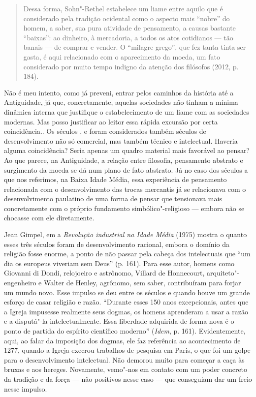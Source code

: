 \begin{quote}
Dessa forma, Sohn"-Rethel estabelece um liame entre aquilo que é
considerado pela tradição ocidental como o aspecto mais ``nobre'' do
homem, a saber, sua pura atividade de pensamento, a causas bastante
``baixas'': ao dinheiro, à mercadoria, a todos os atos cotidianos ---
tão banais --- de comprar e vender. O ``milagre grego'', que fez tanta
tinta ser gasta, é aqui relacionado com o aparecimento da moeda, um fato
considerado por muito tempo indigno da atenção dos filósofos (2012, p. 184).
\end{quote}

Não é meu intento, como já preveni, entrar pelos caminhos da história
até a Antiguidade, já que, concretamente, aquelas sociedades não tinham
a mínima dinâmica interna que justifique o estabelecimento de um liame
com as sociedades modernas. Mas posso justificar ao leitor essa rápida
excursão por certa coincidência.. Os séculos ,
 e  foram considerados também
séculos de desenvolvimento não só comercial, mas também técnico e
intelectual. Haveria alguma coincidência? Seria apenas um quadro
material mais favorável ao pensar? Ao que parece, na Antiguidade, a
relação entre filosofia, pensamento abstrato e surgimento da moeda se dá
num plano de fato abstrato. Já no caso dos séculos a que nos referimos,
na Baixa Idade Média, essa experiência de pensamento relacionada com o
desenvolvimento das trocas mercantis já se relacionava com o
desenvolvimento paulatino de uma forma de pensar que tensionava mais
concretamente com o próprio fundamento simbólico"-religioso --- embora não
se chocasse com ele diretamente.

Jean Gimpel, em a \emph{Revolução industrial na Idade Média} (1975)
mostra o quanto esses três séculos foram de desenvolvimento racional,
embora o domínio da religião fosse enorme, a ponto de não passar pela
cabeça dos intelectuais que ``um dia os europeus viveriam sem Deus'' (p.
161). Para esse autor, homens como Giovanni di Dondi, relojoeiro e
astrônomo, Villard de Honnecourt, arquiteto"-engenheiro e Walter de
Henley, agrônomo, sem saber, contribuíram para forjar um mundo novo.
Esse impulso se deu entre os séculos  e  quando houve um grande
esforço de casar religião e razão. ``Durante esses 150 anos
excepcionais, antes que a Igreja impusesse realmente seus dogmas, os
homens aprenderam a usar a razão e a disputá"-la intelectualmente. Essa
liberdade adquirida de forma nova é o ponto de partida do espírito
científico moderno'' (\emph{Idem}, p. 161). Evidentemente, aqui, ao
falar da imposição dos dogmas, ele faz referência ao acontecimento de
1277, quando a Igreja execrou trabalhos de pesquisa em Paris, o que foi
um golpe para o desenvolvimento intelectual. Não demorou muito para
começar a caça às bruxas e aos hereges. Novamente, vemo"-nos em contato
com um poder concreto da tradição e da força --- não positivos nesse caso
--- que conseguiam dar um freio nesse impulso.

